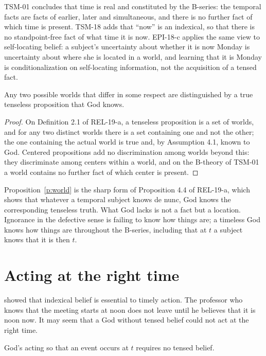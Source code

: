 \documentclass{situationist-preprint}
\begin{document}
TSM-01 concludes that time is real and constituted by the B-series: the temporal facts are facts of earlier, later and simultaneous, and there is no further fact of which time is present. TSM-18 adds that \enquote{now} is an indexical, so that there is no standpoint-free fact of what time it is now. EPI-18-c applies the same view to self-locating belief: a subject's uncertainty about whether it is now Monday is uncertainty about where she is located in a world, and learning that it is Monday is conditionalization on self-locating information, not the acquisition of a tensed fact.

\begin{proposition}\label{p:world}
Any two possible worlds that differ in some respect are distinguished by a true tenseless proposition that God knows.
\end{proposition}

\begin{proof}
On Definition 2.1 of REL-19-a, a tenseless proposition is a set of worlds, and for any two distinct worlds there is a set containing one and not the other; the one containing the actual world is true and, by Assumption 4.1, known to God. Centered propositions add no discrimination among worlds beyond this: they discriminate among centers within a world, and on the B-theory of TSM-01 a world contains no further fact of which center is present.
\end{proof}

Proposition~\ref{p:world} is the sharp form of Proposition 4.4 of REL-19-a, which shows that whatever a temporal subject knows de nunc, God knows the corresponding tenseless truth. What God lacks is not a fact but a location. Ignorance in the defective sense is failing to know how things are; a timeless God knows how things are throughout the B-series, including that at $t$ a subject knows that it is then $t$.

\section{Acting at the right time}

\citet{Perry1979} showed that indexical belief is essential to timely action. The professor who knows that the meeting starts at noon does not leave until he believes that it is noon now. It may seem that a God without tensed belief could not act at the right time.

\begin{proposition}\label{p:action}
God's acting so that an event occurs at $t$ requires no tensed belief.
\end{proposition}
\end{document}
